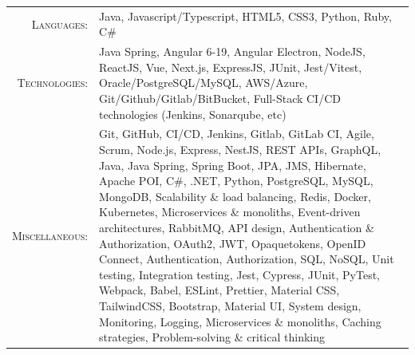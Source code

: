 \documentclass[a4paper,10pt]{article}
\begin{document}
\begin{tabular}{rp{12cm}}
 \textsc{Languages:} &  Java, Javascript/Typescript, HTML5, CSS3, Python, Ruby, C\# \\
 
 \textsc{Technologies:} &
                        Java Spring,
                        Angular 6-19,
                        Angular Electron,
                        NodeJS,
                        ReactJS,
                        Vue,
                        Next.js,
                        ExpressJS,
                        JUnit,
                        Jest/Vitest,
                        Oracle/PostgreSQL/MySQL,
                        AWS/Azure,
                        Git/Github/Gitlab/BitBucket,
                        Full-Stack CI/CD technologies (Jenkins, Sonarqube, etc) \\

                

    \textsc{Miscellaneous:} & 
        Git, GitHub, CI/CD, Jenkins, Gitlab, GitLab CI, Agile, Scrum, Node.js, Express, NestJS, REST APIs, GraphQL, Java, Java Spring, Spring Boot, JPA, JMS, Hibernate, Apache POI, C\#, .NET, Python, PostgreSQL, MySQL, MongoDB, Scalability \& load balancing, Redis, Docker, Kubernetes, Microservices \& monoliths, Event-driven architectures, RabbitMQ, API design, Authentication \& Authorization, OAuth2, JWT, Opaquetokens, OpenID Connect, Authentication, Authorization, SQL, NoSQL, Unit testing, Integration testing, Jest, Cypress, JUnit, PyTest, Webpack, Babel, ESLint, Prettier, Material CSS, TailwindCSS, Bootstrap, Material UI, System design, Monitoring, Logging, Microservices \& monoliths, Caching strategies, Problem-solving \& critical thinking
\end{tabular}

    
\end{document}
